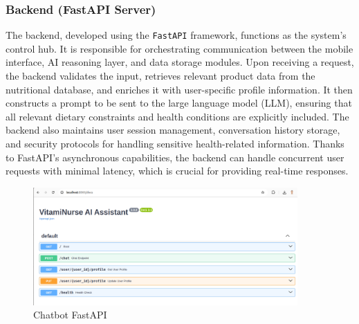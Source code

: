 \subsubsection{Backend (FastAPI Server)}
The backend, developed using the \texttt{FastAPI} framework, functions as the system’s control hub. It is responsible for orchestrating communication between the mobile interface, AI reasoning layer, and data storage modules. Upon receiving a request, the backend validates the input, retrieves relevant product data from the nutritional database, and enriches it with user-specific profile information. It then constructs a prompt to be sent to the large language model (LLM), ensuring that all relevant dietary constraints and health conditions are explicitly included. The backend also maintains user session management, conversation history storage, and security protocols for handling sensitive health-related information. Thanks to FastAPI’s asynchronous capabilities, the backend can handle concurrent user requests with minimal latency, which is crucial for providing real-time responses.
 \begin{center}
    \begin{figure}[H]
    \includegraphics[width=0.9\textwidth]{images/chatbot_API.png}
    \caption{Chatbot FastAPI} 
    \label{fig:chatbot API}
\end{figure}
\end{center}

\newpage
